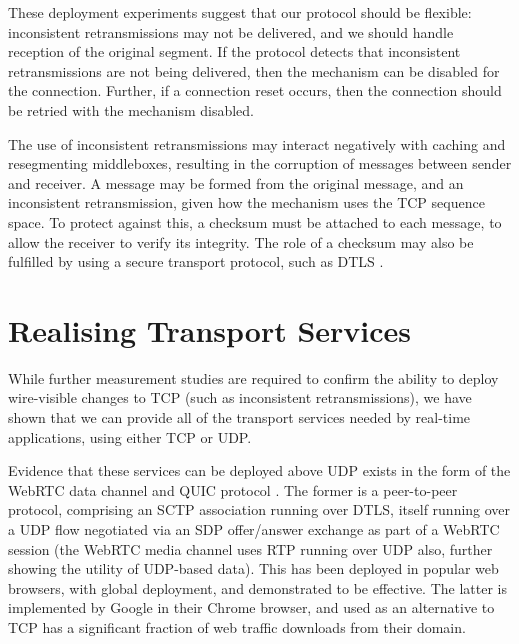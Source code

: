 \documentclass{sig-alternate-05-2015}
\begin{document}
These deployment experiments suggest that our protocol should be
flexible: inconsistent retransmissions may not be delivered, and we should
handle reception of the original segment. If the protocol detects that
inconsistent retransmissions are not being delivered, then the mechanism
can be disabled for the connection. Further, if a connection reset occurs,
then the connection should be retried with the mechanism disabled.

The use of inconsistent retransmissions may interact negatively with
caching and resegmenting middleboxes, resulting in the corruption of
messages between sender and receiver. A message may be formed from the
original message, and an inconsistent retransmission, given how the
mechanism uses the TCP sequence space. To protect against this, a checksum
must be attached to each message, to allow the receiver to verify its
integrity. The role of a checksum may also be fulfilled by using a secure
transport protocol, such as DTLS \cite{rfc:6347}.

\section{Realising Transport Services}
\label{sec:realising}

While further measurement studies are required to confirm the ability to
deploy wire-visible changes to TCP (such as inconsistent retransmissions),
we have shown that we can provide all of the transport services needed by
real-time applications, using either TCP or UDP. 

Evidence that these services can be deployed above UDP exists in the form
of the WebRTC data channel \cite{draft-ietf-rtcweb-data-channel-13} and
QUIC protocol \cite{draft-tsvwg-quic-protocol-02}.  
The former is a peer-to-peer protocol, comprising an SCTP association
running over DTLS, itself running over a UDP flow negotiated via an SDP
\cite{RFC4566} offer/answer exchange \cite{RFC3264} as part of a WebRTC
session \cite{jennings:2013:rtcweb} (the WebRTC media channel uses RTP
running over UDP also, further showing the utility of UDP-based data). 
This has been deployed in popular web browsers, with global deployment, and
demonstrated to be effective.  The latter is implemented by Google in their
Chrome browser, and used as an alternative to TCP has a significant
fraction of web traffic downloads from their domain.

\end{document}
